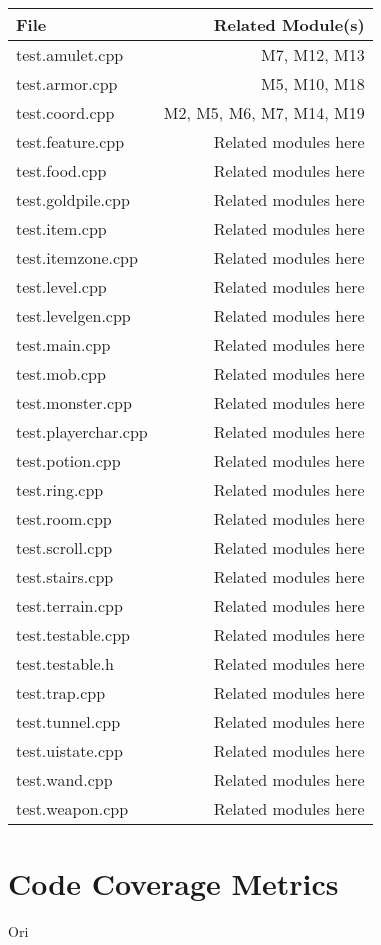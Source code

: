 \documentclass[12pt, titlepage]{article}
\begin{document}
	\begin{table}[h]
		\caption{\bf Test-Module Trace}
		\label{TblMH}
		\bigskip
		\centering
		\def\arraystretch{1.2}
			\begin{longtable}{lr}
				\hline
				File & Related Module(s)\\
				\hline
				test.amulet.cpp 		& M7, M12, M13\\
				test.armor.cpp 			& M5, M10, M18\\
				test.coord.cpp 			& M2, M5, M6, M7, M14, M19\\
				test.feature.cpp 		& Related modules here\\
				test.food.cpp 			& Related modules here\\
				test.goldpile.cpp 		& Related modules here\\
				test.item.cpp 			& Related modules here\\
				test.itemzone.cpp 		& Related modules here\\
				test.level.cpp 			& Related modules here\\
				test.levelgen.cpp 		& Related modules here\\
				test.main.cpp 			& Related modules here\\
				test.mob.cpp 			& Related modules here\\
				test.monster.cpp 		& Related modules here\\
				test.playerchar.cpp 	& Related modules here\\
				test.potion.cpp 		& Related modules here\\
				test.ring.cpp 			& Related modules here\\
				test.room.cpp 			& Related modules here\\
				test.scroll.cpp 		& Related modules here\\
				test.stairs.cpp 		& Related modules here\\
				test.terrain.cpp 		& Related modules here\\
				test.testable.cpp 		& Related modules here\\
				test.testable.h 		& Related modules here\\
				test.trap.cpp 			& Related modules here\\
				test.tunnel.cpp 		& Related modules here\\
				test.uistate.cpp 		& Related modules here\\
				test.wand.cpp 			& Related modules here\\
				test.weapon.cpp 		& Related modules here\\
				\hline
			\end{longtable}
	\end{table}



\section{Code Coverage Metrics}
	Ori




\end{document}
